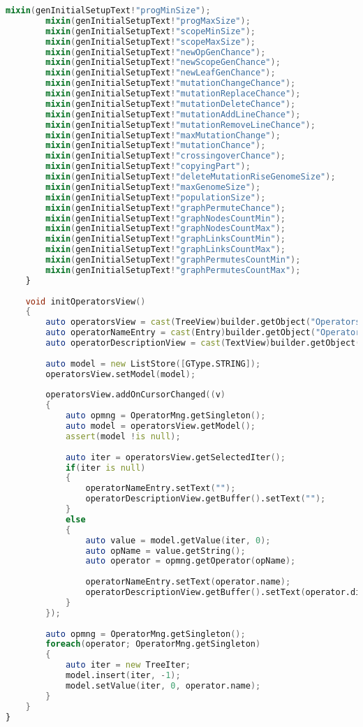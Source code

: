 \documentclass[russian,utf8,emptystyle]{eskdtext}
\begin{document}
\begin{lstlisting}[language=D]
        mixin(genInitialSetupText!"progMinSize");
        mixin(genInitialSetupText!"progMaxSize");
        mixin(genInitialSetupText!"scopeMinSize");
        mixin(genInitialSetupText!"scopeMaxSize");
        mixin(genInitialSetupText!"newOpGenChance");
        mixin(genInitialSetupText!"newScopeGenChance");
        mixin(genInitialSetupText!"newLeafGenChance");
        mixin(genInitialSetupText!"mutationChangeChance");
        mixin(genInitialSetupText!"mutationReplaceChance");
        mixin(genInitialSetupText!"mutationDeleteChance");
        mixin(genInitialSetupText!"mutationAddLineChance");
        mixin(genInitialSetupText!"mutationRemoveLineChance");
        mixin(genInitialSetupText!"maxMutationChange");
        mixin(genInitialSetupText!"mutationChance");
        mixin(genInitialSetupText!"crossingoverChance");
        mixin(genInitialSetupText!"copyingPart");
        mixin(genInitialSetupText!"deleteMutationRiseGenomeSize");
        mixin(genInitialSetupText!"maxGenomeSize");
        mixin(genInitialSetupText!"populationSize");
        mixin(genInitialSetupText!"graphPermuteChance");
        mixin(genInitialSetupText!"graphNodesCountMin");
        mixin(genInitialSetupText!"graphNodesCountMax");
        mixin(genInitialSetupText!"graphLinksCountMin");
        mixin(genInitialSetupText!"graphLinksCountMax");
        mixin(genInitialSetupText!"graphPermutesCountMin");
        mixin(genInitialSetupText!"graphPermutesCountMax");
    }
    
    void initOperatorsView()
    {
        auto operatorsView = cast(TreeView)builder.getObject("OperatorsView");
        auto operatorNameEntry = cast(Entry)builder.getObject("OperatorNameEntry");
        auto operatorDescriptionView = cast(TextView)builder.getObject("OperatorDescriptionView");
        
        auto model = new ListStore([GType.STRING]);
        operatorsView.setModel(model);
        
        operatorsView.addOnCursorChanged((v)
        {
            auto opmng = OperatorMng.getSingleton();
            auto model = operatorsView.getModel();
            assert(model !is null);
            
            auto iter = operatorsView.getSelectedIter();
            if(iter is null)
            {
                operatorNameEntry.setText("");
                operatorDescriptionView.getBuffer().setText("");
            }
            else
            {
                auto value = model.getValue(iter, 0);
                auto opName = value.getString();
                auto operator = opmng.getOperator(opName);
                
                operatorNameEntry.setText(operator.name);
                operatorDescriptionView.getBuffer().setText(operator.disrc);
            }
        });
        
        auto opmng = OperatorMng.getSingleton();
        foreach(operator; OperatorMng.getSingleton)
        {
            auto iter = new TreeIter;
            model.insert(iter, -1);
            model.setValue(iter, 0, operator.name);
        }
    }
}
\end{lstlisting}
\end{document}
